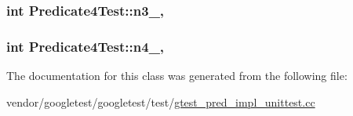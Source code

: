 \subsubsection[{\texorpdfstring{n3\+\_\+}{n3_}}]{\setlength{\rightskip}{0pt plus 5cm}int Predicate4\+Test\+::n3\+\_\+\hspace{0.3cm}{\ttfamily [static]}, {\ttfamily [protected]}}\hypertarget{classPredicate4Test_a00ae6ae54c7d6639d448c036aedb6114}{}\label{classPredicate4Test_a00ae6ae54c7d6639d448c036aedb6114}
\subsubsection[{\texorpdfstring{n4\+\_\+}{n4_}}]{\setlength{\rightskip}{0pt plus 5cm}int Predicate4\+Test\+::n4\+\_\+\hspace{0.3cm}{\ttfamily [static]}, {\ttfamily [protected]}}\hypertarget{classPredicate4Test_ae42e23ce11e3f1c6b813496d6180cc67}{}\label{classPredicate4Test_ae42e23ce11e3f1c6b813496d6180cc67}


The documentation for this class was generated from the following file\+:\begin{DoxyCompactItemize}
\item 
vendor/googletest/googletest/test/\hyperlink{gtest__pred__impl__unittest_8cc}{gtest\+\_\+pred\+\_\+impl\+\_\+unittest.\+cc}\end{DoxyCompactItemize}
